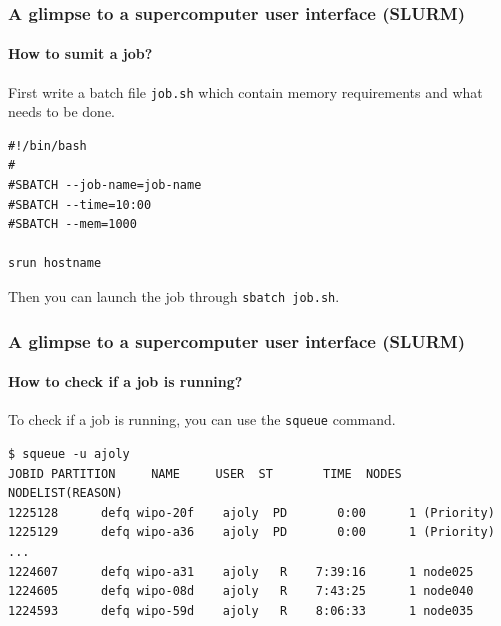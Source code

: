 \documentclass[11pt,compress,serif]{beamer}
\begin{document}
\begin{frame}[fragile=singleslide]
\frametitle{A glimpse to a supercomputer user interface (SLURM)}
\framesubtitle{How to sumit a job?}

First write a batch file \texttt{job.sh} which contain memory requirements
and what needs to be done.

\begin{verbatim}
#!/bin/bash
#
#SBATCH --job-name=job-name
#SBATCH --time=10:00
#SBATCH --mem=1000

srun hostname
\end{verbatim}

Then you can launch the job through \texttt{sbatch job.sh}.

\end{frame}

\begin{frame}[fragile=singleslide]
\frametitle{A glimpse to a supercomputer user interface (SLURM)}
\framesubtitle{How to check if a job is running?}

To check if a job is running, you can use the \texttt{squeue} command.

\begin{scriptsize}
\begin{verbatim}
$ squeue -u ajoly
JOBID PARTITION     NAME     USER  ST       TIME  NODES NODELIST(REASON)
1225128      defq wipo-20f    ajoly  PD       0:00      1 (Priority)
1225129      defq wipo-a36    ajoly  PD       0:00      1 (Priority)
...
1224607      defq wipo-a31    ajoly   R    7:39:16      1 node025
1224605      defq wipo-08d    ajoly   R    7:43:25      1 node040
1224593      defq wipo-59d    ajoly   R    8:06:33      1 node035
\end{verbatim}
\end{scriptsize}

\end{frame}


\end{document}
